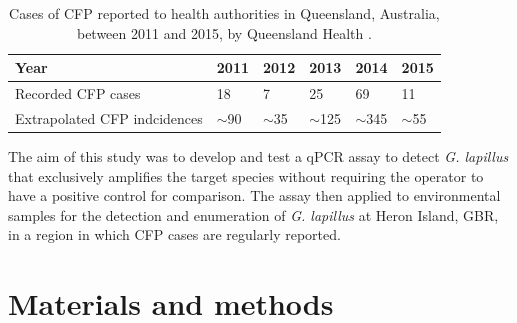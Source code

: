 \documentclass[12pt]{article}
\begin{document}
\begin{table}
\caption{Cases of CFP reported to health authorities in Queensland, Australia, between 2011 and 2015, by Queensland Health \citep{qldcig}.}
\label{tbl:CFPTable}
\begin{tabular}{ | p{6cm} | p{1.5cm} | p{1.5cm}| p{1.5cm} | p{1.5cm} | p{1.5cm} | }
\hline
Year &2011&2012&2013&2014&2015\\
\hline
Recorded CFP cases&18&7&25&69&11\\
\hline
Extrapolated CFP indcidences&$\sim$90&$\sim$35&$\sim$125&$\sim$345&$\sim$55\\
\hline
\end{tabular}
\end{table}
\FloatBarrier

The aim of this study was to develop and test a qPCR assay to detect \emph{G. lapillus} %
that exclusively amplifies the target species without requiring the operator to have a positive control for comparison. 
The assay then applied to environmental samples for the detection and enumeration of \textit{G. lapillus} at Heron Island, GBR, in a region in which CFP cases are regularly reported.
\newpage
\section*{Materials and methods}
\end{document}
